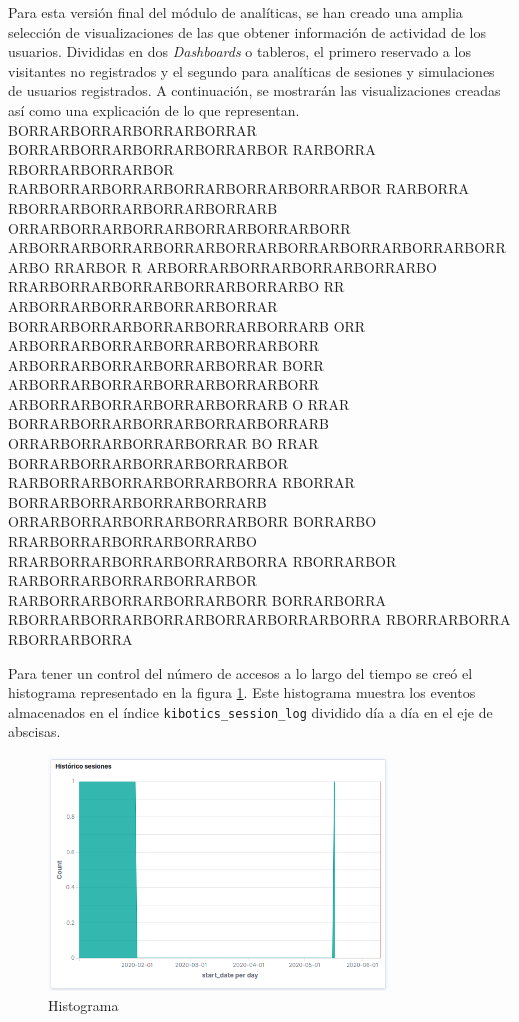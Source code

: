 \documentclass[11pt,a4paper]{book}
\begin{document}
				Para esta versión final del módulo de analíticas, se han creado una amplia selección de visualizaciones de las que obtener información de actividad de los usuarios. Divididas en dos \textit{Dashboards} o tableros, el primero reservado a los visitantes no registrados y el segundo para analíticas de sesiones y simulaciones de usuarios registrados. A continuación, se mostrarán las visualizaciones creadas así como una explicación de lo que representan.\\
				
				BORRARBORRARBORRARBORRAR BORRARBORRARBORRARBORRARBOR RARBORRA RBORRARBORRARBOR RARBORRARBORRARBORRARBORRARBORRARBOR RARBORRA RBORRARBORRARBORRARBORRARB ORRARBORRARBORRARBORRARBORRARBORR   ARBORRARBORRARBORRARBORRARBORRARBORRARBORRARBORRARBO RRARBOR R ARBORRARBORRARBORRARBORRARBO RRARBORRARBORRARBORRARBORRARBO RR ARBORRARBORRARBORRARBORRAR BORRARBORRARBORRARBORRARBORRARB ORR ARBORRARBORRARBORRARBORRARBORR ARBORRARBORRARBORRARBORRAR
				BORR   ARBORRARBORRARBORRARBORRARBORR ARBORRARBORRARBORRARBORRARB O RRAR BORRARBORRARBORRARBORRARBORRARB ORRARBORRARBORRARBORRAR BO RRAR BORRARBORRARBORRARBORRARBOR RARBORRARBORRARBORRARBORRA
				RBORRAR BORRARBORRARBORRARBORRARB ORRARBORRARBORRARBORRARBORR
				BORRARBO  RRARBORRARBORRARBORRARBO RRARBORRARBORRARBORRARBORRA
				RBORRARBOR RARBORRARBORRARBORRARBOR RARBORRARBORRARBORRARBORR BORRARBORRA RBORRARBORRARBORRARBORRARBORRARBORRA RBORRARBORRA
				RBORRARBORRA
				
				Para tener un control del número de accesos a lo largo del tiempo se creó el histograma representado en la figura \ref{fig:kibana_histogram}. Este histograma muestra los eventos almacenados en el índice \texttt{kibotics\_session\_log} dividido día a día en el eje de abscisas.	
				\begin{figure}[H]
					\centering
					\includegraphics[width=9cm, keepaspectratio]{img/kibana_01_histogram}
					\caption{Histograma}
					\label{fig:kibana_histogram}
				\end{figure}
\end{document}
